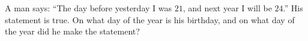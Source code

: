 A man says: ``The day before yesterday I was $21$, and next year I will be $24$.'' His statement is true. On what day of the year is his birthday, and on what day of the year did he make the statement?
